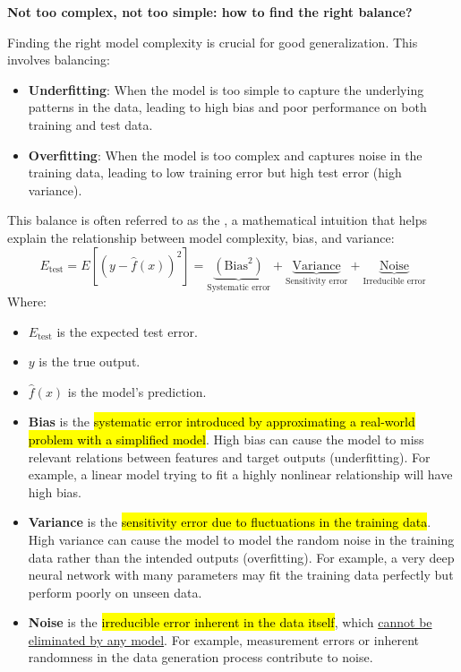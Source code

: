 \highspace
\begin{flushleft}
    \textcolor{Green3}{ \textbf{Not too complex, not too simple: how to find the right balance?}}
\end{flushleft}
Finding the right model complexity is crucial for good generalization. This involves balancing:
\begin{itemize}
    \item \textbf{Underfitting}: When the model is too simple to capture the underlying patterns in the data, leading to high bias and poor performance on both training and test data.
    \item \textbf{Overfitting}: When the model is too complex and captures noise in the training data, leading to low training error but high test error (high variance).
\end{itemize}
This balance is often referred to as the , a mathematical intuition that helps explain the relationship between model complexity, bias, and variance:
\begin{equation}
    E_{\text{test}} = E\left[\left(y - \hat{f}(x)\right)^{2}\right] =
    \underbrace{\left(\text{Bias}^{2}\right)}_{\text{Systematic error}} +
    \underbrace{\text{Variance}}_{\text{Sensitivity error}} +
    \underbrace{\text{Noise}}_{\text{Irreducible error}}
\end{equation}
Where:
\begin{itemize}
    \item $E_{\text{test}}$ is the expected test error.
    \item $y$ is the true output.
    \item $\hat{f}(x)$ is the model's prediction.
    \item \textbf{Bias} is the \hl{systematic error introduced by approximating a real-world problem with a simplified model}. High bias can cause the model to miss relevant relations between features and target outputs (underfitting). For example, a linear model trying to fit a highly nonlinear relationship will have high bias.
    \item \textbf{Variance} is the \hl{sensitivity error due to fluctuations in the training data}. High variance can cause the model to model the random noise in the training data rather than the intended outputs (overfitting). For example, a very deep neural network with many parameters may fit the training data perfectly but perform poorly on unseen data.
    \item \textbf{Noise} is the \hl{irreducible error inherent in the data itself}, which \underline{cannot be} \underline{eliminated by any model}. For example, measurement errors or inherent randomness in the data generation process contribute to noise.
\end{itemize}
